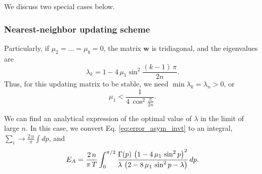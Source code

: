 \documentclass[reprint, floatfix]{revtex4-1}
\newcommand{\Err}{E}
\begin{document}
We discuss two special cases below.



\subsubsection{Nearest-neighbor updating scheme}



Particularly, if $\mu_2 = \dots = \mu_b = 0$,
the matrix $\mathbf w$ is tridiagonal,
and the eigenvalues are
\begin{equation}
  \lambda_k = 1 - 4 \, \mu_1 \sin^2 \frac{(k - 1) \, \pi}{2n}.
\label{eq:wnn_eigenvalue}
\end{equation}
%
Thus, for this updating matrix to be stable,
we need
$\min \lambda_k = \lambda_n > 0$,
or
\begin{equation}
\mu_1 < \frac{1}{4 \, \cos^2\frac{\pi}{2n} }.
\label{eq:nn_stable}
\end{equation}



We can find an analytical expression
of the optimal value of $\lambda$
in the limit of large $n$.
%
In this case,
we convert Eq.
\eqref{eq:error_asym_invt}
to an integral,
$\sum_i \to \frac{2 \, n}{\pi} \int dp$, and
%
\begin{align}
\Err_A
=
\frac{2 \, n}{\pi \, T}
\int_0^{\pi/2}
  \frac{ \Gamma(p) \, \left(1 - 4 \, \mu_1 \, \sin^2 p \right)^2    }
       {   \lambda \, \left(2 - 8 \, \mu_1 \, \sin^2 p - \lambda \right) }
\, dp.
\notag
\end{align}
\end{document}
